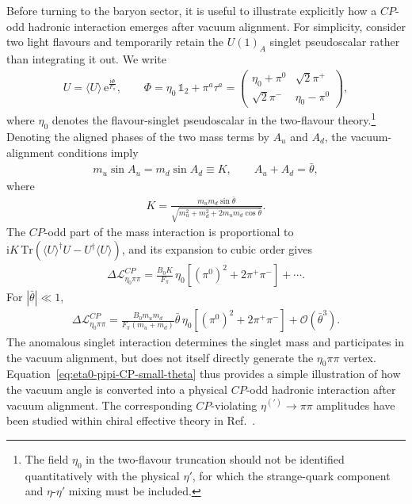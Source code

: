 \documentclass[review]{elsarticle}
\numberwithin{equation}{section}
\numberwithin{table}{section}
\numberwithin{figure}{section}
\def\i{\mathrm{i}}
\def\e{\mathrm{e}}
\def\tr{\mathrm{Tr}}
\begin{document}
Before turning to the baryon sector, it is useful to illustrate explicitly how a $CP$-odd hadronic interaction emerges after vacuum alignment. For simplicity, consider two light flavours and temporarily retain the $U(1)_A$ singlet pseudoscalar rather than integrating it out. We write
\begin{align}
    U=\langle U\rangle\,\e^{\frac{\i\Phi}{F_\pi}},
    \qquad
    \Phi= \eta_0\,\mathbb{1}_2+\pi^a\tau^a
    =
    \begin{pmatrix}
        \eta_0+\pi^0 & \sqrt{2}\pi^+\\
        \sqrt{2}\pi^- & \eta_0-\pi^0
    \end{pmatrix},
    \label{eq:U2-meson-expansion}
\end{align}
where $\eta_0$ denotes the flavour-singlet pseudoscalar in the two-flavour theory.\footnote{The field $\eta_0$ in the two-flavour truncation should not be identified quantitatively with the physical $\eta'$, for which the strange-quark component and $\eta$-$\eta'$ mixing must be included.} Denoting the aligned phases of the two mass terms by $A_u$ and $A_d$, the vacuum-alignment conditions imply
\begin{align}
    m_u\sin A_u = m_d\sin A_d\equiv K,
    \qquad
    A_u+A_d=\bar\theta ,
\end{align}
where
\begin{align}
    K = \frac{m_um_d\sin\bar\theta}
    {\sqrt{m_u^2+m_d^2+2m_um_d\cos\bar\theta}}.
    \label{eq:K-theta}
\end{align}
The $CP$-odd part of the mass interaction is proportional to
$\i K\,\tr(\langle U\rangle^\dagger U-U^\dagger\langle U\rangle)$, and its expansion to cubic order gives
\begin{align}
    \Delta\mathcal{L}^{CP}_{\eta_0\pi\pi} 
    = \frac{B_0K}{F_\pi}\, \eta_0 \left[(\pi^0)^2+2\pi^+\pi^-
    \right] +\cdots.
    \label{eq:eta0-pipi-CP}
\end{align}
For $|\bar\theta|\ll1$,
\begin{align}
    \Delta\mathcal{L}^{CP}_{\eta_0\pi\pi}
    =
    \frac{B_0m_um_d}{F_\pi(m_u+m_d)} \bar\theta\, \eta_0 \left[
    (\pi^0)^2+2\pi^+\pi^- \right] +\mathcal{O}(\bar\theta^3).
    \label{eq:eta0-pipi-CP-small-theta}
\end{align}
The anomalous singlet interaction determines the singlet mass and participates in the vacuum alignment, but does not itself directly generate the $\eta_0\pi\pi$ vertex. Equation~\eqref{eq:eta0-pipi-CP-small-theta} thus provides a simple illustration of how the vacuum angle is converted into a physical $CP$-odd hadronic interaction after vacuum alignment. The corresponding $CP$-violating $\eta^{(\prime)}\rightarrow\pi\pi$ amplitudes have been studied within chiral effective theory in Ref.~\cite{Pich:1991fq}.
\end{document}
